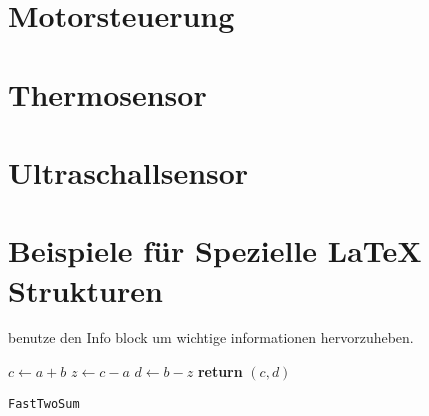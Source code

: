 \documentclass{article}
\begin{document}
\newpage
\section{Motorsteuerung} %

\newpage
\section{Thermosensor} %

\newpage
\section{Ultraschallsensor} %


\newpage
\section{Beispiele für Spezielle LaTeX Strukturen}

\begin{info} %
	benutze den Info block um wichtige informationen hervorzuheben.
\end{info}


\begin{center}
	\begin{minipage}{0.5\linewidth} %
		\begin{algorithm}[H]
			\medskip
			$c \leftarrow a + b$ \;
			$z \leftarrow c - a$ \;
			$d \leftarrow b - z$ \;
			{\bf return} $(c,d)$ \;
			\caption{\texttt{FastTwoSum}} %
			\label{alg:fastTwoSum}   %
		\end{algorithm}
	\end{minipage}
\end{center}
\end{document}
